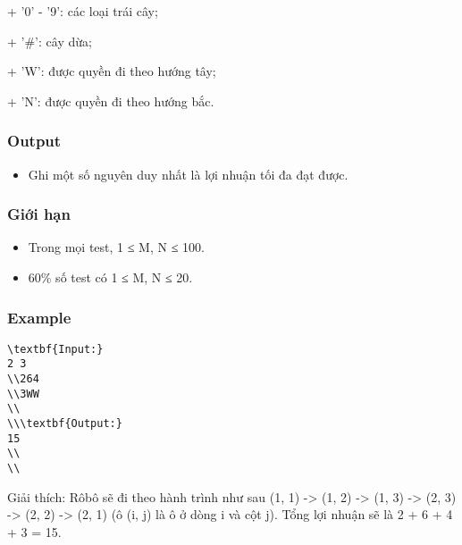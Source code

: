    + '0' - '9': các loại trái cây;  

   + '\#': cây dừa;  

   + 'W': được quyền đi theo hướng tây;  

   + 'N': được quyền đi theo hướng bắc.  

\subsubsection{   Output  }
\begin{itemize}
	\item     Ghi một số nguyên duy nhất là lợi nhuận tối đa đạt được.   
\end{itemize}

\subsubsection{   Giới hạn  }
\begin{itemize}
	\item     Trong mọi test, 1 ≤ M, N ≤ 100.   
	\item     60\% số test có 1 ≤ M, N ≤ 20.   
\end{itemize}

\subsubsection{   Example  }
\begin{verbatim}
\textbf{Input:}
2 3
\\264
\\3WW
\\
\\\textbf{Output:}
15
\\
\\\end{verbatim}

Giải thích: Rôbô sẽ đi theo hành trình như sau (1, 1) -> (1, 2) -> (1, 3) -> (2, 3) -> (2, 2) -> (2, 1) (ô (i, j) là ô ở dòng i và cột j). Tổng lợi nhuận sẽ là 2 + 6 + 4 + 3 = 15.

